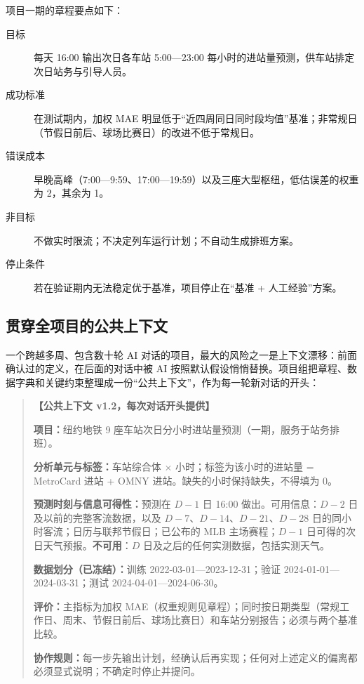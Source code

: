 项目一期的章程要点如下：

\begin{description}
  \item[目标] 每天 16:00 输出次日各车站 5:00—23:00 每小时的进站量预测，供车站排定次日站务与引导人员。
  \item[成功标准] 在测试期内，加权 MAE 明显低于“近四周同日同时段均值”基准；非常规日（节假日前后、球场比赛日）的改进不低于常规日。
  \item[错误成本] 早晚高峰（7:00—9:59、17:00—19:59）以及三座大型枢纽，低估误差的权重为 2，其余为 1。
  \item[非目标] 不做实时限流；不决定列车运行计划；不自动生成排班方案。
  \item[停止条件] 若在验证期内无法稳定优于基准，项目停止在“基准 + 人工经验”方案。
\end{description}

\subsection{贯穿全项目的公共上下文}

一个跨越多周、包含数十轮 AI 对话的项目，最大的风险之一是上下文漂移：前面确认过的定义，在后面的对话中被 AI 按照默认假设悄悄替换。项目组把章程、数据字典和关键约束整理成一份“公共上下文”，作为每一轮新对话的开头：

\begin{quote}
\textbf{【公共上下文 v1.2，每次对话开头提供】}

\textbf{项目：}纽约地铁 9 座车站次日分小时进站量预测（一期，服务于站务排班）。

\textbf{分析单元与标签：}车站综合体 $\times$ 小时；标签为该小时的进站量 = MetroCard 进站 + OMNY 进站。缺失的小时保持缺失，不得填为 0。

\textbf{预测时刻与信息可得性：}预测在 $D-1$ 日 16:00 做出。可用信息：$D-2$ 日及以前的完整客流数据，以及 $D-7$、$D-14$、$D-21$、$D-28$ 日的同小时客流；日历与联邦节假日；已公布的 MLB 主场赛程；$D-1$ 日可得的次日天气预报。\textbf{不可用}：$D$ 日及之后的任何实测数据，包括实测天气。

\textbf{数据划分（已冻结）：}训练 2022-03-01—2023-12-31；验证 2024-01-01—2024-03-31；测试 2024-04-01—2024-06-30。

\textbf{评价：}主指标为加权 MAE（权重规则见章程）；同时按日期类型（常规工作日、周末、节假日前后、球场比赛日）和车站分别报告；必须与两个基准比较。

\textbf{协作规则：}每一步先输出计划，经确认后再实现；任何对上述定义的偏离都必须显式说明；不确定时停止并提问。
\end{quote}

